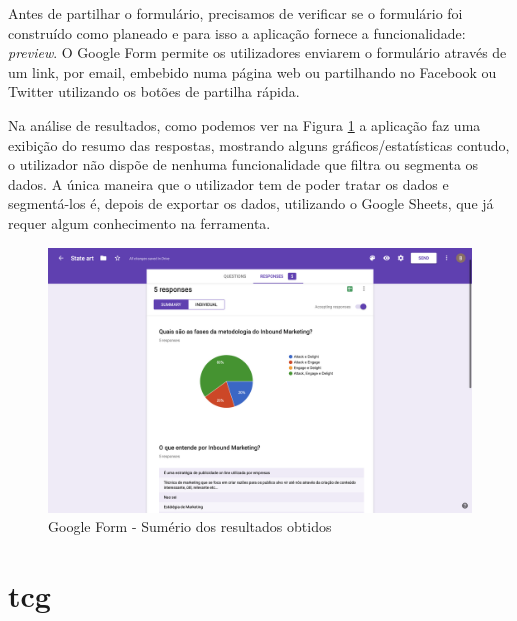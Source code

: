 Antes de partilhar o formulário, precisamos de verificar se o formulário foi construído como planeado e para isso a aplicação fornece a funcionalidade: \textit{preview}. O Google Form permite os utilizadores enviarem o formulário através de um link, por email, embebido numa página web ou partilhando no Facebook ou Twitter utilizando os botões de partilha rápida.

Na análise de resultados, como podemos ver na Figura \ref{fig:gf-form-results} a aplicação faz uma exibição do resumo das respostas, mostrando alguns gráficos/estatísticas contudo, o utilizador não dispõe de nenhuma funcionalidade que filtra ou segmenta os dados. A única maneira que o utilizador tem de poder tratar os dados e segmentá-los é, depois de exportar os dados, utilizando o Google Sheets, que já requer algum conhecimento na ferramenta. 

\newpage
\mbox{}

\begin{figure}[ht!]
	\begin{center}
		\includegraphics[width=1\textwidth]{img/gf/gf-form-results}
		\caption{Google Form - Sumério dos resultados obtidos}
		\label{fig:gf-form-results}
	\end{center}
\end{figure}

\section{\acrfull{tcg}}
\label{sec:TCG}

